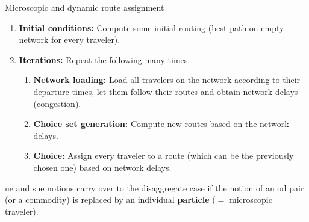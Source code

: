 \begin{algorithm}[H]
\label{dynamic-micro-routes}

\caption{Microscopic and dynamic route assignment}

\begin{enumerate}

\item \textbf{Initial conditions:} Compute some initial routing (\eg best path on empty network
  for every traveler).

\item \textbf{Iterations:} Repeat the following many times.

\begin{enumerate}

\item \textbf{Network loading:} Load all travelers on the network
  according to their departure times, let them follow their
  routes and obtain network delays (congestion).

\item \textbf{Choice set generation:} Compute new routes based on the
  network delays.

\item \textbf{Choice:} Assign every traveler to a route 
  (which can be the previously chosen one) based on network delays.

\end{enumerate} %

\end{enumerate}

\end{algorithm}

 \gls{ue} and \gls{sue} notions carry over to the disaggregate case if the notion of an \gls{od} pair (or a commodity) is replaced by  an individual \textbf{particle} ($=$ microscopic traveler).

